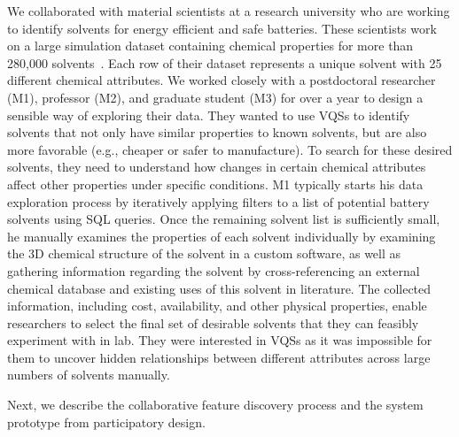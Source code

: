  \par\noindent{} We collaborated with material scientists at a research university who are working to identify solvents for energy efficient and safe batteries. These scientists work on a large simulation dataset containing chemical properties for more than 280,000 solvents~\cite{Khetan2018}. Each row of their dataset represents a unique solvent with 25 different chemical attributes. We worked closely with a postdoctoral researcher (M1), professor (M2), and graduate student (M3) for over a year to design a sensible way of exploring their data. They wanted to use VQSs to identify solvents that not only have similar properties to known solvents, but are also more favorable (e.g., cheaper or safer to manufacture). To search for these desired solvents, they need to understand how changes in certain chemical attributes affect other properties under specific conditions.
 \npar M1 typically starts his data exploration process by iteratively applying filters to a list of potential battery solvents using SQL queries. Once the remaining solvent list is sufficiently small, he manually examines the properties of each solvent individually by examining the 3D chemical structure of the solvent in a custom software, as well as gathering information regarding the solvent by cross-referencing an external chemical database and existing uses of this solvent in literature. The collected information, including cost, availability, and other physical properties, enable researchers to select the final set of desirable solvents that they can feasibly experiment with in lab. They were interested in VQSs as it was impossible for them to uncover hidden relationships between different attributes across large numbers of solvents manually.%
 \par Next, we describe the collaborative feature discovery process and the system prototype from participatory design.
 